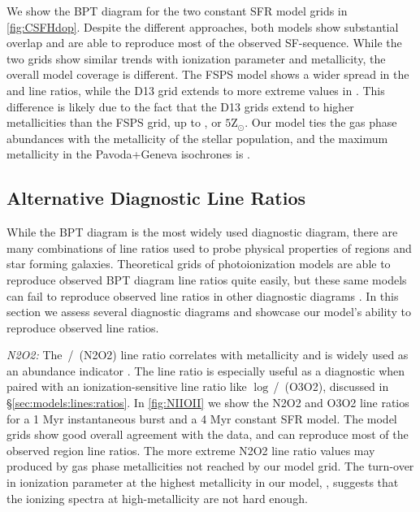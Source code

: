 We show the BPT diagram for the two constant SFR model grids in \ref{fig:CSFHdop}. Despite the different approaches, both models show substantial overlap and are able to reproduce most of the observed SF-sequence. While the two grids show similar trends with ionization parameter and metallicity, the overall model coverage is different. The FSPS model shows a wider spread in the \niiha{} and \oiiihb{} line ratios, while the D13 grid extends to more extreme values in \oiiihb{}. This difference is likely due to the fact that the D13 grids extend to higher metallicities than the FSPS grid, up to , or $5\mathrm{Z}_{\odot}$. Our model ties the gas phase abundances with the metallicity of the stellar population, and the maximum metallicity in the Pavoda+Geneva isochrones is .

\subsection{Alternative Diagnostic Line Ratios}\label{sec:models:discussion}

While the BPT diagram is the most widely used diagnostic diagram, there are many combinations of line ratios used to probe physical properties of \hii regions and star forming galaxies. Theoretical grids of photoionization models are able to reproduce observed BPT diagram line ratios quite easily, but these same models can fail to reproduce observed line ratios in other diagnostic diagrams \citep[e.g., ][]{Telford16}. In this section we assess several diagnostic diagrams and showcase our model's ability to reproduce observed line ratios.

{\it N2O2:} The \nii{}\,/\,\oii{} (N2O2) line ratio correlates with metallicity and is widely used as an abundance indicator \citep{Levesque10, Dopita00, VO87}. The line ratio is especially useful as a diagnostic when paired with an ionization-sensitive line ratio like $\log$\oiii{}\,/\,\oii{} (O3O2), discussed in \S\ref{sec:models:lines:ratios}. In \ref{fig:NIIOII} we show the N2O2 and O3O2 line ratios for a 1 Myr instantaneous burst and a 4 Myr constant SFR model. The model grids show good overall agreement with the data, and can reproduce most of the observed \hii region line ratios. The more extreme N2O2 line ratio values may produced by gas phase metallicities not reached by our model grid. The turn-over in ionization parameter at the highest metallicity in our model, , suggests that the ionizing spectra at high-metallicity are not hard enough.

